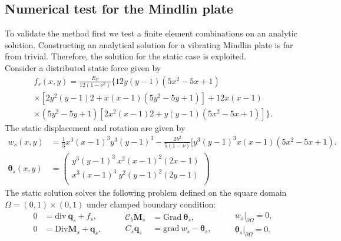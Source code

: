 \subsection{Numerical test for the Mindlin plate}\label{sec:numtest_min}
To validate the method first we test a finite element combinations on an analytic solution. Constructing an analytical solution for a vibrating Mindlin plate is far from trivial. Therefore, the solution for the static case \cite{veiga2013} is exploited. \\

Consider a distributed static force given by 
\begin{equation*}
\begin{aligned}
f_s(x,y)=\frac{E_Y}{12 (1-\nu^2)} \{12 y(y-1)(5x^2-5x+1) \\
\times [2y^2(y-1)2+x(x-1)(5y^2-5y+1)] +12x(x-1)\\
\times (5y^2-5y+1)[2x^2(x-1)2+y(y-1)(5x^2-5x+1)]\}.
\end{aligned}
\end{equation*}
The static displacement and rotation are given by
\begin{align*}
w_s(x,y) &= \frac{1}{3} x^3(x-1)^3 y^3 (y-1)^3 -\frac{2 b^2}{5(1-\nu)}[y^3(y-1)^3 x(x-1)(5 x^2-5x+1). \\
\bm{\theta}_{s}(x,y) &= 
\begin{pmatrix}
y^3(y-1)^3 \ x^2 (x-1)^2 (2x-1) \\
x^3(x-1)^3 \ y^2 (y-1)^2 (2y-1) \\
\end{pmatrix}
\end{align*}
The static solution solves the following problem defined on the square domain $\Omega=(0,1)\times(0,1)$ under clamped boundary condition:
\begin{equation}
\begin{aligned}
0 &= \mathrm{div} \ \bm{q}_s + f_s , \\
0 &= \mathrm{Div} \bm{M}_s + \bm{q}_s, \\
\end{aligned} \qquad
\begin{aligned}
\bm{\mathcal{C}}_b\bm{M}_s &= \mathrm{Grad} \ \bm{\theta}_s, \\
C_s \bm{q}_s &= \mathrm{grad} \ w_s - \bm{\theta}_s, \\
\end{aligned}
\qquad
\begin{aligned}
w_s\vert_{\partial\Omega} = 0, \\
\bm{\theta}_s\vert_{\partial\Omega} = 0. \\
\end{aligned}
\end{equation}
